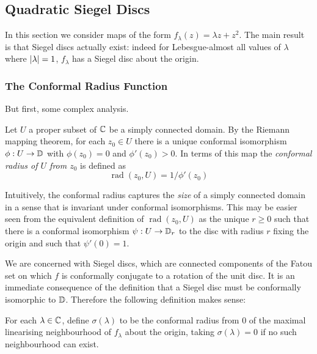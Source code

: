 \documentclass[../main.tex]{subfiles}
\newcommand\crad[2]{\operatorname{rad}({#1}, {#2})}
\begin{document}
\subsection{Quadratic Siegel Discs}

In this section we consider maps of the form $f_\lambda(z) = \lambda z + z^2$. The main result is that Siegel discs actually exist: indeed for Lebesgue-almost all values of $\lambda$ where $\left|\lambda\right| = 1$, $f_\lambda$ has a Siegel disc about the origin.

\subsubsection{The Conformal Radius Function}

But first, some complex analysis.

\begin{dfn}
    \label{def:conformal-radius}
    Let $U$ a proper subset of $\mathbb{C}$ be a simply connected domain. By the Riemann mapping theorem, for each $z_0 \in U$ there is a unique conformal isomorphism $\phi : U \to \mathbb{D}$ with $\phi(z_0) = 0$ and $\phi'(z_0) > 0$. In terms of this map the \emph{conformal radius of $U$ from $z_0$} is defined as
    \[
    \crad{z_0}{U} = 1/\phi'(z_0)
    \]
\end{dfn}

Intuitively, the conformal radius captures the \emph{size} of a simply connected domain in a sense that is invariant under conformal isomorphisms. This may be easier seen from the equivalent definition of $\crad{z_0}{U}$ as the unique $r \ge 0$ such that there is a conformal isomorphism $\psi: U \to \mathbb{D}_r$ to the disc with radius $r$ fixing the origin and such that $\psi'(0) = 1$.

We are concerned with Siegel discs, which are connected components of the Fatou set on which $f$ is conformally conjugate to a rotation of the unit disc. It is an immediate consequence of the definition that a Siegel disc must be conformally isomorphic to $\mathbb{D}$. Therefore the following definition makes sense:

\begin{dfn}
    \label{def: conformal-radius-function}
    For each $\lambda \in \mathbb{C}$, define $\sigma(\lambda)$ to be the conformal radius from 0 of the maximal linearising neighbourhood of $f_\lambda$ about the origin, taking $\sigma(\lambda) = 0$ if no such neighbourhood can exist.
\end{dfn}
\end{document}
